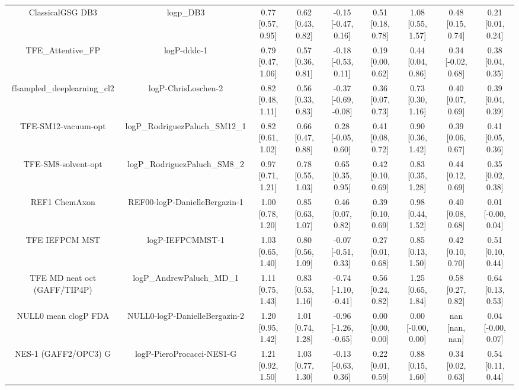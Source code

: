 \documentclass{article}
\begin{document}
\begin{center}
\begin{longtable}{|ccccccccc|}
             ClassicalGSG DB3 &                                      logp\_DB3 &  0.77 [0.57, 0.95] &  0.62 [0.43, 0.82] &   -0.15 [-0.47, 0.16] &  0.51 [0.18, 0.78] &     1.08 [0.55, 1.57] &     0.48 [0.15, 0.74] &     0.21 [0.01, 0.24] \\
             TFE_Attentive_FP &                                    logP-dddc-1 &  0.79 [0.47, 1.06] &  0.57 [0.36, 0.81] &   -0.18 [-0.53, 0.11] &  0.19 [0.00, 0.62] &     0.44 [0.04, 0.86] &    0.34 [-0.02, 0.68] &     0.38 [0.04, 0.35] \\
   ffsampled_deeplearning_cl2 &                            logP-ChrisLoschen-2 &  0.82 [0.48, 1.11] &  0.56 [0.33, 0.83] &  -0.37 [-0.69, -0.08] &  0.36 [0.07, 0.73] &     0.73 [0.30, 1.16] &     0.40 [0.07, 0.69] &     0.39 [0.04, 0.39] \\
          TFE-SM12-vacuum-opt &                 logP\_RodriguezPaluch\_SM12\_1 &  0.82 [0.61, 1.02] &  0.66 [0.47, 0.88] &    0.28 [-0.05, 0.60] &  0.41 [0.08, 0.72] &     0.90 [0.36, 1.42] &     0.39 [0.06, 0.67] &     0.41 [0.05, 0.36] \\
          TFE-SM8-solvent-opt &                  logP\_RodriguezPaluch\_SM8\_2 &  0.97 [0.71, 1.21] &  0.78 [0.55, 1.03] &     0.65 [0.35, 0.95] &  0.42 [0.10, 0.69] &     0.83 [0.35, 1.28] &     0.44 [0.12, 0.69] &     0.35 [0.02, 0.38] \\
                REF1 ChemAxon &                  REF00-logP-DanielleBergazin-1 &  1.00 [0.78, 1.20] &  0.85 [0.63, 1.07] &     0.46 [0.07, 0.82] &  0.39 [0.10, 0.69] &     0.98 [0.44, 1.52] &     0.40 [0.08, 0.68] &    0.01 [-0.00, 0.04] \\
               TFE IEFPCM MST &                               logP-IEFPCMMST-1 &  1.03 [0.65, 1.40] &  0.80 [0.56, 1.09] &   -0.07 [-0.51, 0.33] &  0.27 [0.01, 0.68] &     0.85 [0.13, 1.50] &     0.42 [0.10, 0.70] &     0.51 [0.10, 0.44] \\
 TFE MD neat oct (GAFF/TIP4P) &                      logP\_AndrewPaluch\_MD\_1 &  1.11 [0.75, 1.43] &  0.83 [0.53, 1.16] &  -0.74 [-1.10, -0.41] &  0.56 [0.24, 0.82] &     1.25 [0.65, 1.84] &     0.58 [0.27, 0.82] &     0.64 [0.13, 0.53] \\
         NULL0 mean clogP FDA &                  NULL0-logP-DanielleBergazin-2 &  1.20 [0.95, 1.42] &  1.01 [0.74, 1.28] &  -0.96 [-1.26, -0.65] &  0.00 [0.00, 0.00] &    0.00 [-0.00, 0.00] &        nan [nan, nan] &    0.04 [-0.00, 0.07] \\
         NES-1 (GAFF2/OPC3) G &                      logP-PieroProcacci-NES1-G &  1.21 [0.92, 1.50] &  1.03 [0.77, 1.30] &   -0.13 [-0.63, 0.36] &  0.22 [0.01, 0.59] &     0.88 [0.15, 1.60] &     0.34 [0.02, 0.63] &     0.54 [0.11, 0.44] \\

\end{longtable}
\end{center}
\end{document}
